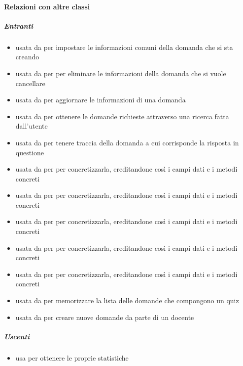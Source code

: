 \paragraph{Relazioni con altre classi}
\subparagraph{Entranti}
\begin{itemize}
\item usata da  per impostare le informazioni comuni della domanda che si sta creando
\item usata da  per per eliminare le informazioni della domanda che si vuole cancellare
\item usata da  per aggiornare le informazioni di una domanda
\item usata da  per ottenere le domande richieste attraverso una ricerca fatta dall'utente
\item usata da  per tenere traccia della domanda a cui corrisponde la risposta in questione
\item usata da  per per concretizzarla, ereditandone così i campi dati e i metodi concreti
\item usata da  per per concretizzarla, ereditandone così i campi dati e i metodi concreti
\item usata da  per per concretizzarla, ereditandone così i campi dati e i metodi concreti
\item usata da  per per concretizzarla, ereditandone così i campi dati e i metodi concreti
\item usata da  per per concretizzarla, ereditandone così i campi dati e i metodi concreti
\item usata da  per memorizzare la lista delle domande che compongono un quiz
\item usata da  per creare nuove domande da parte di un docente
\end{itemize}
\subparagraph{Uscenti}
\begin{itemize}
\item usa  per ottenere le proprie statistiche
\end{itemize}
